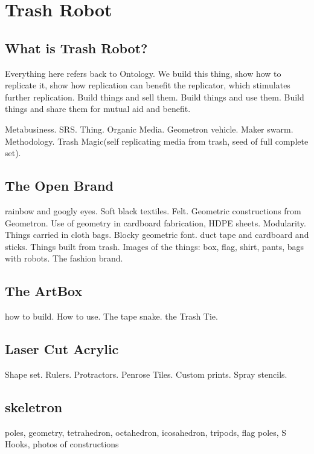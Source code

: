 \section{Trash Robot}

\subsection{What is Trash Robot?}

Everything here refers back to Ontology.  We build this thing, show how to replicate it, show how replication can benefit the replicator, which stimulates further replication.  Build things and sell them. Build things and use them. Build things and share them for mutual aid and benefit. 

Metabusiness.  SRS.  Thing.  Organic Media. Geometron vehicle.  Maker swarm. Methodology.  Trash Magic(self replicating media from trash, seed of full complete set).

\subsection{The Open Brand}

rainbow and googly eyes.  Soft black textiles. Felt.  Geometric constructions from Geometron.  Use of geometry in cardboard fabrication, HDPE sheets. Modularity.  Things carried in cloth bags. Blocky geometric font.  duct tape and cardboard and sticks. Things built from trash.  Images of the things: box, flag, shirt, pants, bags with robots.  The fashion brand.  

\subsection{The ArtBox}

how to build.  How to use.  The tape snake. the Trash Tie.

\subsection{Laser Cut Acrylic}

Shape set. Rulers. Protractors. Penrose Tiles. Custom prints. Spray stencils.  

\subsection{skeletron}

poles, geometry, tetrahedron, octahedron, icosahedron, tripods, flag poles, S Hooks, photos of constructions

